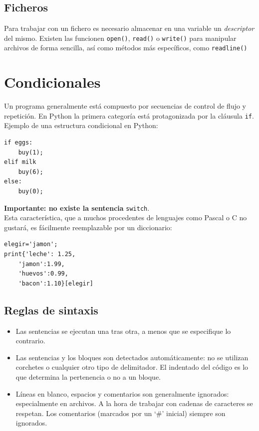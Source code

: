 \documentclass[12pt]{article} %
\begin{document}
\subsection{Ficheros}
Para trabajar con un fichero es necesario almacenar en una variable un \textit{descriptor} del mismo. Existen las funcionen \verb+open()+, \verb+read()+ o \verb+write()+ para manipular archivos de forma sencilla, así como métodos más específicos, como \verb+readline()+


\section{Condicionales}
Un programa generalmente está compuesto por secuencias de control de flujo y repetición. En Python la primera categoría está protagonizada por la cláusula \verb+if+.
Ejemplo de una estructura condicional en Python:
\begin{lstlisting}[frame=single, showspaces=false]
if eggs:
	buy(1);
elif milk
	buy(6);
else:
	buy(0);
\end{lstlisting}
{\textbf{Importante: no existe la sentencia} \verb+switch+.}\\
Esta característica, que a muchos procedentes de lenguajes como Pascal o C no gustará, es fácilmente reemplazable por un diccionario:
\begin{lstlisting}[frame=single, showspaces=false]
elegir='jamon';
print{'leche': 1.25,
	'jamon':1.99,
	'huevos':0.99,
	'bacon':1.10}[elegir]
\end{lstlisting}
\subsection{Reglas de sintaxis}
\begin{itemize}
	\item Las sentencias se ejecutan una tras otra, a menos que se especifique lo contrario.
	\item Las sentencias y los bloques son detectados automáticamente: no se utilizan corchetes o cualquier otro tipo de delimitador. El indentado del código es lo que determina la pertenencia o no a un bloque.
	\item Líneas en blanco, espacios y comentarios son generalmente ignorados: especialmente en archivos. A la hora de trabajar con cadenas de caracteres se respetan. Los comentarios (marcados por un `\#' inicial) siempre son ignorados.
\end{itemize}
\end{document}
